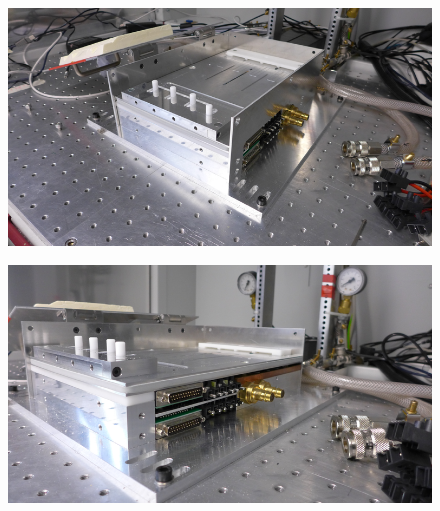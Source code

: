 \documentclass[a4paper,12pt,twoside]{article}
\begin{document}
\begin{appendices}
\begin{figure} [h!]
\centering
\begin{minipage}{.48\textwidth}
  \centering
  \includegraphics[width=\textwidth]{./Figures/Point5a.png}
  \label{Step5a}
\end{minipage}%
\hspace{2mm}
\begin{minipage}{.48\textwidth}
  \centering
  \includegraphics[width=\textwidth]{./Figures/Point5b.png}
  \label{Step5b}
\end{minipage}
\end{figure}


\end{appendices}
\end{document}
